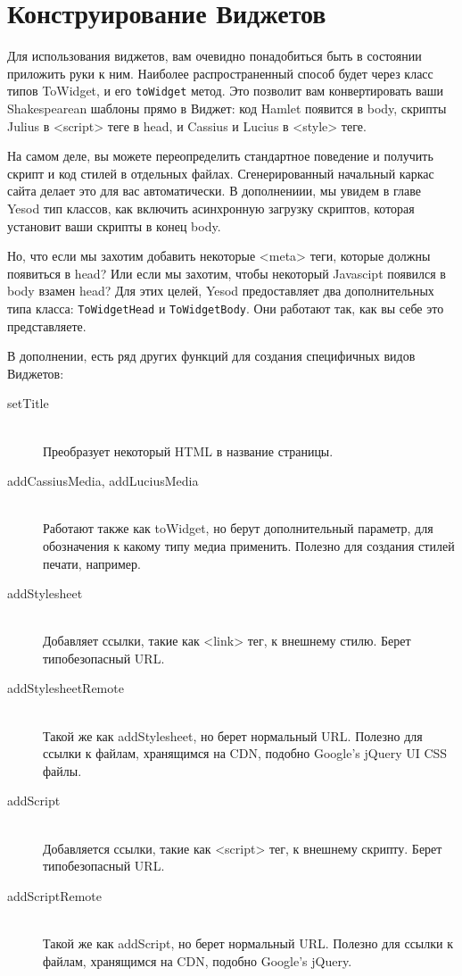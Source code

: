 \section{Конструирование Виджетов}

Для использования виджетов, вам очевидно понадобиться быть в состоянии приложить руки к ним. Наиболее распространенный способ будет через класс типов ToWidget, и его \lstinline'toWidget' метод. Это позволит вам конвертировать ваши Shakespearean шаблоны прямо в Виджет: код Hamlet появится в body, скрипты Julius в <script> теге в head, и Cassius и Lucius в <style> теге.

На самом деле, вы можете переопределить стандартное поведение и получить скрипт и код стилей в отдельных файлах. Сгенерированный начальный каркас сайта делает это для вас автоматически. В дополнениии, мы увидем в главе Yesod тип классов, как включить асинхронную загрузку скриптов, которая установит ваши скрипты в конец body. %

Но, что если мы захотим добавить некоторые <meta> теги, которые должны появиться в head? Или если мы захотим, чтобы некоторый Javascipt появился в body взамен head? Для этих целей, Yesod предоставляет два дополнительных типа класса: \lstinline'ToWidgetHead' и \lstinline'ToWidgetBody'. Они работают так, как вы себе это представляете.

В дополнении, есть ряд других функций для создания специфичных видов Виджетов:
\begin{description}
\item[setTitle] \hfill \\
Преобразует некоторый HTML в название страницы.
\item[addCassiusMedia, addLuciusMedia] \hfill \\
Работают также как toWidget, но берут дополнительный параметр, для обозначения к какому типу медиа применить. Полезно для создания стилей печати, например.
\item[addStylesheet] \hfill \\
Добавляет ссылки, такие как <link> тег, к внешнему стилю. Берет типобезопасный URL.
\item[addStylesheetRemote] \hfill \\
Такой же как addStylesheet, но берет нормальный URL. Полезно для ссылки к файлам, хранящимся на CDN, подобно Google's jQuery UI CSS файлы.
\item[addScript] \hfill \\
Добавляется ссылки, такие как <script> тег, к внешнему скрипту. Берет типобезопасный URL.
\item[addScriptRemote] \hfill \\
Такой же как addScript, но берет нормальный URL. Полезно для ссылки к файлам, хранящимся на CDN, подобно Google's jQuery.
\end{description}

